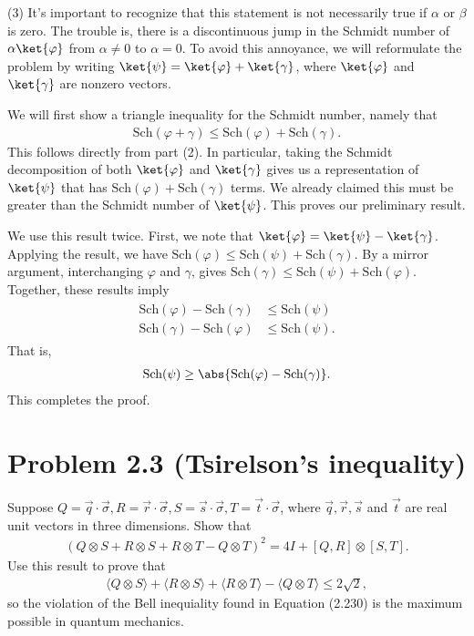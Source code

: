 \documentclass{book}
\begin{document}
    (3) It's important to recognize that this statement is not necessarily true if $\alpha$ or $\beta$ is zero. The trouble is, there is a discontinuous jump in the Schmidt number of $\alpha \ket{\varphi}$ from $\alpha \neq 0$ to $\alpha = 0$. To avoid this annoyance, we will reformulate the problem by writing $\ket{\psi} = \ket{\varphi} + \ket{\gamma}$, where $\ket{\varphi}$ and $\ket{\gamma}$ are nonzero vectors. 

    We will first show a triangle inequality for the Schmidt number, namely that 
    \begin{align}
        \text{Sch}(\varphi + \gamma) \leq \text{Sch}(\varphi) + \text{Sch}(\gamma).
    \end{align}
    This follows directly from part (2). In particular, taking the Schmidt decomposition of both $\ket{\varphi}$ and $\ket{\gamma}$ gives us a representation of $\ket{\psi}$ that has $\text{Sch}(\varphi) + \text{Sch}(\gamma)$ terms. We already claimed this must be greater than the Schmidt number of $\ket{\psi}$. This proves our preliminary result. 

    We use this result twice. First, we note that $\ket{\varphi} = \ket{\psi} - \ket{\gamma}$. Applying the result, we have $\text{Sch}(\varphi) \leq \text{Sch}(\psi) + \text{Sch}(\gamma)$. By a mirror argument, interchanging $\varphi$ and $\gamma$, gives $\text{Sch}(\gamma) \leq \text{Sch}(\psi) + \text{Sch}(\varphi)$.
    Together, these results imply
    \begin{align}
    \begin{aligned}
        \text{Sch}(\varphi) - \text{Sch}(\gamma) &\leq \text{Sch}(\psi) \\
        \text{Sch}(\gamma) - \text{Sch}(\varphi) &\leq \text{Sch}(\psi).
    \end{aligned}
    \end{align}
    That is,
    \begin{align}
        \text{Sch}(\psi) \geq  \abs{\text{Sch}(\varphi) - \text{Sch}(\gamma)}.
    \end{align}
    This completes the proof.

\section*{Problem 2.3 (Tsirelson's inequality)}
    Suppose $Q = \vec{q} \cdot \vec{\sigma}, R = \vec{r} \cdot \vec{\sigma}, S = \vec{s} \cdot \vec{\sigma}, T = \vec{t} \cdot \vec{\sigma}$, where $\vec{q}, \vec{r}, \vec{s}$ and $\vec{t}$ are real unit vectors in three dimensions. Show that 
    \begin{align}
        (Q\otimes S  + R\otimes S + R\otimes T  - Q\otimes T)^2 = 4I + [Q, R] \otimes [S, T].
    \end{align}
    Use this result to prove that 
    \begin{align}
        \langle Q \otimes S\rangle + \langle R \otimes S\rangle + \langle R \otimes T\rangle - \langle Q \otimes T\rangle \leq 2 \sqrt{2},
    \end{align}
    so the violation of the Bell inequiality found in Equation (2.230) is the maximum possible in quantum mechanics.
\end{document}
